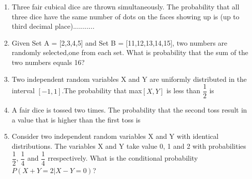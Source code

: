\renewcommand{\theequation}{\theenumi}
\renewcommand{\thefigure}{\theenumi}
\renewcommand{\thetable}{\theenumi}
\begin{enumerate}[label=\thesection.\arabic*.,ref=\thesection.\theenumi]

\item Three fair cubical dice are thrown simultaneously. The probability that all three dice have the same number of dots on the faces showing up is (up to third decimal place)...........
\solution

%
\item Given Set A = [2,3,4,5] and Set B = [11,12,13,14,15], two numbers are randomly selected,one from each set. What is probability that the sum of the two numbers equals 16?

\begin{enumerate}
\end{enumerate}
\solution

%
\item Two independent random variables X and Y are uniformly distributed in the interval $[-1,1]$.The probability that max$[X,Y]$ is less than $\dfrac{1}{2}$ is

\begin{enumerate}
\end{enumerate}
%
\item A fair dice is tossed two times. The probability that the second toss result in a value that is higher than the first toss is
\begin{enumerate}
\end{enumerate}
%
\solution

%
\item Consider two independent random variables X and Y with identical distributions. The variables X and Y take value 0, 1 and 2 with probabilities $\dfrac{1}{2}$, $\dfrac{1}{4}$ and $\dfrac{1}{4}$ rrespectively. What is the conditional probability $P(X+Y = 2|X-Y =0)$?


\end{enumerate}
